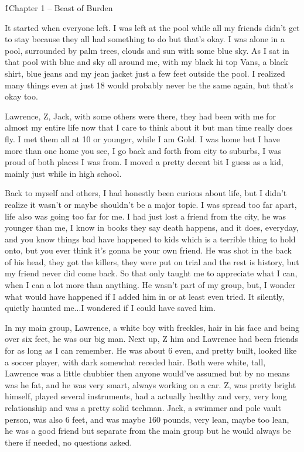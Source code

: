 

\h1{Chapter 1 -- Beast of Burden}



It started when everyone left. I was left at the pool while all my friends didn't get to stay because they all had something to do but that's okay. I was alone in a pool, surrounded by palm trees, clouds and sun with some blue sky. As I sat in that pool with blue and sky all around me, with my black hi top Vans, a black shirt, blue jeans and my jean jacket just a few feet outside the pool. I realized many things even at just 18 would probably never be the same again, but that's okay too.

Lawrence, Z, Jack, with some others were there, they had been with me for almost my entire life now that I care to think about it but man time really does fly. I met them all at 10 or younger, while I am Gold. I was home but I have more than one home you see, I go back and forth from city to suburbs, I was proud of both places I was from. I moved a pretty decent bit I guess as a kid, mainly just while in high school.

Back to myself and others, I had honestly been curious about life, but I didn't realize it wasn't or maybe shouldn’t be a major topic. I was spread too far apart, life also was going too far for me. I had just lost a friend from the city, he was younger than me, I know in books they say death happens, and it does, everyday, and you know things bad have happened to kids which is a terrible thing to hold onto, but you ever think it's gonna be your own friend. He was shot in the back of his head, they got the killers, they were put on trial and the rest is history, but my friend never did come back. So that only taught me to appreciate what I can, when I can a lot more than anything. He wasn’t part of my group, but, I wonder what would have happened if I added him in or at least even tried. It silently, quietly haunted me...I wondered if I could have saved him.

In my main group, Lawrence, a white boy with freckles, hair in his face and being over six feet, he was our big man. Next up, Z him and Lawrence had been friends for as long as I can remember. He was about 6 even, and pretty built, looked like a soccer player, with dark somewhat receded hair. Both were white, tall, Lawrence was a little chubbier then anyone would’ve assumed but by no means was he fat, and he was very smart, always working on a car. Z, was pretty bright himself, played several instruments, had a actually healthy and very, very long relationship and was a pretty solid techman. Jack, a swimmer and pole vault person, was also 6 feet, and was maybe 160 pounds, very lean, maybe too lean, he was a good friend but separate from the main group but he would always be there if needed, no questions asked.

